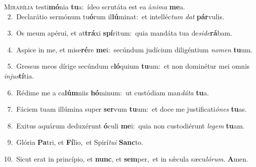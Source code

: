 \lettrine{\initial\textcolor{\initialcolor}{M}}{irabília} testi\-\textbf{mó}\-nia \textbf{tu}\-a:~\star ídeo scrutáta est ea á\-\textit{ni}\-\textit{ma} \textbf{me}\-a.\\
{\numbfont\textcolor{\numbcolor}{~2.}}~Declarátio sermónum tu\-\textbf{ó}\-rum il\-\textbf{lú}\-minat:~\star et intelléc\textit{tum} \textit{dat} \textbf{pár}\-vulis.\par
{\numbfont\textcolor{\numbcolor}{~3.}}~Os meum apérui, et at\-\textbf{trá}\-xi \textbf{spí}\-ritum:~\star quia mandáta tua de\-\textit{si}\-\textit{de}\textbf{rá}bam.\par
{\numbfont\textcolor{\numbcolor}{~4.}}~Aspice in me, et mise\-\textbf{ré}\-re \textbf{me}\-i:~\star secúndum judícium diligéntium \textit{no}\-\textit{men} \textbf{tu}\-um.\par
{\numbfont\textcolor{\numbcolor}{~5.}}~Gressus meos dírige secúndum e\-\textbf{ló}\-quium \textbf{tu}\-um:~\star et non dominétur mei omnis \textit{in}\-\textit{jus}\textbf{tí}tia.\par
{\numbfont\textcolor{\numbcolor}{~6.}}~Rédime me a ca\-\textbf{lúm}\-niis \textbf{hó}\-minum:~\star ut custódiam man\-\textit{dá}\-\textit{ta} \textbf{tu}\-a.\par
{\numbfont\textcolor{\numbcolor}{~7.}}~Fáciem tuam illúmina super \textbf{ser}\-vum \textbf{tu}\-um:~\star et doce me justificati\-\textit{ó}\-\textit{nes} \textbf{tu}\-as.\par
{\numbfont\textcolor{\numbcolor}{~8.}}~Exitus aquárum deduxérunt \textbf{ó}\-culi \textbf{me}\-i:~\star quia non custodiérunt \textit{le}\-\textit{gem} \textbf{tu}\-am.\par
{\numbfont\textcolor{\numbcolor}{~9.}}~Glória \textbf{Pa}\-tri, et \textbf{Fí}\-lio,~\star et Spirí\-\textit{tu}\-\textit{i} \textbf{Sanc}\-to.\par
{\numbfont\textcolor{\numbcolor}{10.}}~Sicut erat in princípio, et \textbf{nunc}\-, et \textbf{sem}\-per,~\star et in sǽcula sæcu\-\textit{ló}\-\textit{rum}. \textbf{A}\-men.\par
